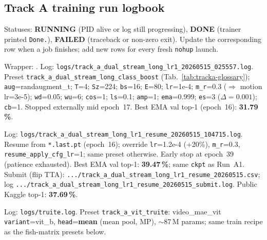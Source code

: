 \subsection{Track A training run logbook}
\label{sec:tracka:runlog}

Statuses: \textbf{RUNNING} (PID alive or log still progressing),
\textbf{DONE} (trainer printed \texttt{Done.}), \textbf{FAILED}
(traceback or non-zero exit).  Update the corresponding row when a job
finishes; add new rows for every fresh \texttt{nohup} launch.

\begin{table}[ht]
\caption{Chronological log of substantial Track-A training jobs.}
\label{tab:tracka-runlog}
\begin{minipage}{\linewidth}\small\sloppy
\begin{description}[leftmargin=1.5em, style=nextline]
\item[\textbf{Run A1} (STOPPED)]
  Wrapper: .
  Log: \texttt{logs/track\_a\_dual\_stream\_long\_lr1\_20260515\_025557.log}.
  Preset \texttt{track\_a\_dual\_stream\_long\_class\_boost}
  (Tab.~\ref{tab:tracka-glossary}); \texttt{aug}=randaugment\_t;
  \texttt{T}=4; \texttt{Sz}=224; \texttt{bs}=16;
  \texttt{E}=80; \texttt{lr}=1e-4; \texttt{m\_r}=0.3
  (\(\Rightarrow\) motion lr=3e-5);
  \texttt{wd}=0.05; \texttt{wu}=6; \texttt{cos}=1; \texttt{ls}=0.1;
  \texttt{amp}=1; \texttt{ema}=0.999;
  \texttt{es}=3 (\(\Delta=0.001\)); \texttt{cb}=1.
  Stopped externally mid epoch~17.  Best EMA val top-1 (epoch~16):
  \textbf{31.79\,\%}.
\item[\textbf{Run A1b} (DONE)]
  Log: \texttt{logs/track\_a\_dual\_stream\_long\_lr1\_resume\_20260515\_104715.log}.
  Resume from \texttt{*.last.pt} (epoch~16); override
  \texttt{lr}=1.2e-4 (+20\%), \texttt{m\_r}=0.3,
  \texttt{resume\_apply\_cfg\_lr}=1; same preset otherwise.
  Early stop at epoch~39 (patience exhausted).  Best EMA val top-1:
  \textbf{39.47\,\%}; same \texttt{ckpt} as Run~A1.
  Submit (flip TTA): \texttt{.../track\_a\_dual\_stream\_long\_lr1\_resume\_20260515.csv};
  log \texttt{.../track\_a\_dual\_stream\_long\_lr1\_resume\_20260515\_submit.log}.
  Public Kaggle top-1: \textbf{37.69\,\%}.
\item[\textbf{Run A2 / truite} (DONE -- FAILED LEARNING)]
  Log: \texttt{logs/truite.log}.
  Preset \texttt{track\_a\_vit\_truite}: video\_mae\_vit \texttt{variant}=vit\_b,
  \texttt{head}=\textbf{mean} (mean pool, MP), \(\sim\)87\,M params;
  same train recipe as the fish-matrix presets below.

\end{description}
\end{minipage}
\end{table}
